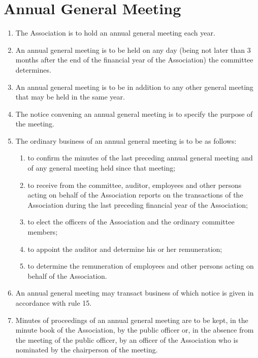 \documentclass[a4paper,11pt]{article}
\begin{document}
\section{Annual General Meeting}
\begin{enumerate}
	\item The Association is to hold an annual general meeting each year.
	\item An annual general meeting is to be held on any day (being not later than 3 months after the end of the financial year of the Association) the committee determines.
	\item An annual general meeting is to be in addition to any other general meeting that may be held in the same year.
	\item The notice convening an annual general meeting is to specify the purpose of the meeting.
	
	\item The ordinary business of an annual general meeting is to be as follows:
	\begin{enumerate}
		\item to confirm the minutes of the last preceding annual general meeting and of any general meeting held since that meeting;
		\item to receive from the committee, auditor, employees and other persons acting on behalf of the Association reports on the transactions of the Association during the last preceding financial year of the Association;
		\item to elect the officers of the Association and the ordinary committee members;
		\item to appoint the auditor and determine his or her remuneration;
		\item to determine the remuneration of employees and other persons acting on behalf of the Association.
	\end{enumerate}
	
	\item An annual general meeting may transact business of which notice is given in accordance with rule 15.
	\item Minutes of proceedings of an annual general meeting are to be kept, in the minute book of the Association, by the public officer or, in the absence from the meeting of the public officer, by an officer of the Association who is nominated by the chairperson of the meeting.
\end{enumerate}
\end{document}
